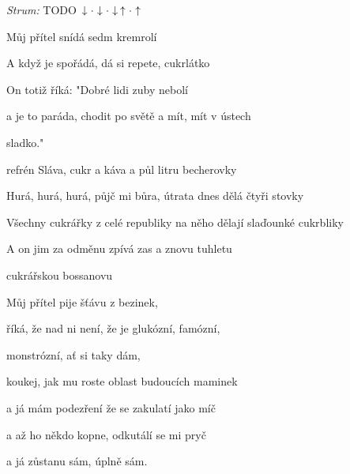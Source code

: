 \begin{song}


 \quad
\textit{Strum:} TODO $\Down\Miss\Down\Miss\Down\Up\Miss\Up$

\large


\large

\bigskip

Můj přítel  snídá sedm kremrolí  \par
A když je spořádá, dá si repete, cukrlátko  \par
On totiž říká:  "Dobré lidi zuby nebolí  \par
a je to paráda, chodit po světě a mít, mít v ústech \par
{}sladko."    \par

\bigskip

\begin{chorusboxwide}{refrén}
Sláva,  cukr a káva a půl litru becherovky \par
{}Hurá, hurá, hurá, půjč mi bůra, útrata dnes dělá čtyři stovky \par
Všechny cukrářky z celé  republiky na něho dělají slaďounké cukrbliky \par
A on jim za odměnu zpívá zas a znovu tuhletu  \par
cukrářskou bossanovu    \par
\end{chorusboxwide}

\bigskip

Můj přítel  pije šťávu z bezinek,  \par
říká, že nad ni není, že je glukózní, famózní, \par
{}monstrózní, ať si taky dám, \par
koukej, jak mu roste  oblast budoucích maminek  \par
a já mám podezření že se zakulatí jako míč \par
a až ho někdo kopne, odkutálí se mi pryč \par
a já zůstanu sám,  úplně sám.  \par


\end{song}
